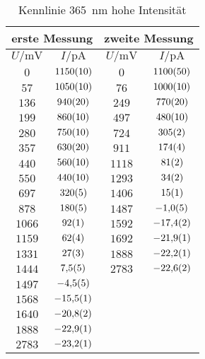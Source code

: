 \begin{table}[H]
   \centering
\caption{Kennlinie \SI{365}{nm} hohe Intensität}
\begin{tabular}{cc||cc}
\hline\multicolumn{2}{c||}{erste Messung} & \multicolumn{2}{c}{zweite Messung}\\

\hline
$U / \unit{\milli\volt}$ & $I / \unit{\pico\ampere}$ & $U / \unit{\milli\volt}$ & $I / \unit{\pico\ampere}$ \\ 
\hline
$\num{0}$ & $\num{1150\pm 10}$ & $\num{0}$ & $\num{1100\pm 50}$ \\
$\num{57}$ & $\num{1050\pm 10}$ & $\num{76}$ & $\num{1000\pm 10}$ \\
$\num{136}$ & $\num{940\pm 20}$ & $\num{249}$ & $\num{770\pm 20}$ \\
$\num{199}$ & $\num{860\pm 10}$ & $\num{497}$ & $\num{480\pm 10}$ \\
$\num{280}$ & $\num{750\pm 10}$ & $\num{724}$ & $\num{305\pm 2}$ \\
$\num{357}$ & $\num{630\pm 20}$ & $\num{911}$ & $\num{174\pm 4}$ \\
$\num{440}$ & $\num{560\pm 10}$ & $\num{1118}$ & $\num{81\pm 2}$ \\
$\num{550}$ & $\num{440\pm 10}$ & $\num{1293}$ & $\num{34\pm 2}$ \\
$\num{697}$ & $\num{320\pm 5}$ & $\num{1406}$ & $\num{15\pm 1}$ \\
$\num{878}$ & $\num{180\pm 5}$ & $\num{1487}$ & $\num{-1.0\pm 0.5}$ \\
$\num{1066}$ & $\num{92\pm 1}$ & $\num{1592}$ & $\num{-17.4\pm 0.2}$ \\
$\num{1159}$ & $\num{62\pm 4}$ & $\num{1692}$ & $\num{-21.9\pm 0.1}$ \\
$\num{1331}$ & $\num{27\pm 3}$ & $\num{1888}$ & $\num{-22.2\pm 0.1}$ \\
$\num{1444}$ & $\num{7.5\pm 0.5}$ & $\num{2783}$ & $\num{-22.6\pm 0.2}$ \\
$\num{1497}$ & $\num{-4.5\pm 0.5}$ &    &    \\
$\num{1568}$ & $\num{-15.5\pm 0.1}$ &    &    \\
$\num{1640}$ & $\num{-20.8\pm 0.2}$ &    &    \\
$\num{1888}$ & $\num{-22.9\pm 0.1}$ &    &    \\
$\num{2783}$ & $\num{-23.2\pm 0.1}$ &    &    \\
\hline\end{tabular}
\label{kennlinie_365nm_hohe_intensität}
\end{table}